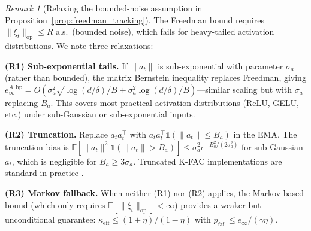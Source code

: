 \documentclass{article}
\providecommand{\E}{\mathbb{E}}
\providecommand{\norm}[1]{\lVert #1 \rVert}
\theoremstyle{plain}
\theoremstyle{definition}
\theoremstyle{remark}
\newtheorem{remark}{Remark}
\begin{document}
\begin{remark}[Relaxing the bounded-noise assumption in Proposition~\ref{prop:freedman_tracking}]
\label{rem:relax_freedman}
The Freedman bound requires $\norm{\xi_t}_{\mathrm{op}} \leq R$ a.s.\ (bounded noise), which fails for heavy-tailed activation distributions. We note three relaxations:

\textbf{(R1) Sub-exponential tails.} If $\norm{a_t}$ is sub-exponential with parameter $\sigma_a$ (rather than bounded), the matrix Bernstein inequality \citep{tropp2011freedman} replaces Freedman, giving $e_\infty^{A,\mathrm{hp}} = O(\sigma_a^2\sqrt{\log(d/\delta)/B} + \sigma_a^2\log(d/\delta)/B)$---similar scaling but with $\sigma_a$ replacing $B_a$. This covers most practical activation distributions (ReLU, GELU, etc.) under sub-Gaussian or sub-exponential inputs.

\textbf{(R2) Truncation.} Replace $a_t a_t^\top$ with $a_t a_t^\top \mathbb{1}(\norm{a_t} \leq B_a)$ in the EMA. The truncation bias is $\E[\norm{a_t}^2\mathbb{1}(\norm{a_t} > B_a)] \leq \sigma_a^2 e^{-B_a^2/(2\sigma_a^2)}$ for sub-Gaussian $a_t$, which is negligible for $B_a \geq 3\sigma_a$. Truncated K-FAC implementations are standard in practice \citep{martens2015optimizing}.

\textbf{(R3) Markov fallback.} When neither (R1) nor (R2) applies, the Markov-based bound (which only requires $\E[\norm{\xi_t}_{\mathrm{op}}] < \infty$) provides a weaker but unconditional guarantee: $\kappa_{\mathrm{eff}} \leq (1+\eta)/(1-\eta)$ with $p_{\mathrm{fail}} \leq e_\infty/(\gamma\eta)$.
\end{remark}
\end{document}
